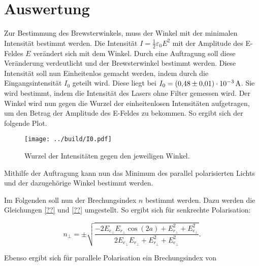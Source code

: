 


\section{Auswertung}
\label{sec:Auswertung}

Zur Bestimmung des Brewsterwinkels, muss der Winkel mit der minimalen Intensität bestimmt werden. 
Die Intensität $I=\frac1 2 \varepsilon_0 E^2$ mit der Amplitude des E-Feldes $E$ verändert sich mit dem Winkel. 
Durch eine Auftragung soll diese Veränderung verdeutlicht und der Brewsterwinkel bestimmt werden. 
Diese Intensität soll nun Einheitenlos gemacht werden, indem durch die Eingangsintensität $I_0$ geteilt wird. 
Diese liegt bei $I_0=\qty{0.48\pm0.01e-3}{\ampere}$. Sie wird bestimmt, indem die Intensität des Lasers ohne 
Filter gemessen wird. 
Der Winkel wird nun gegen die Wurzel der einheitenlosen Intensitäten aufgetragen, um den Betrag der Amplitude des E-Feldes zu bekommen. 
So ergibt sich der folgende Plot.

\begin{figure}
    \texttt{[image: ../build/I0.pdf]}
    \caption{Wurzel der Intensitäten gegen den jeweiligen Winkel.}
\end{figure}

\noindent Mithilfe der Auftragung kann nun das Minimum des parallel polarisierten Lichts und der dazugehörige Winkel bestimmt werden.  

Im Folgenden soll nun der Brechungsindex $n$ bestimmt werden. Dazu werden die Gleichungen \eqref{??} und \eqref{??} umgestellt. 
So ergibt sich für senkrechte Polarisation:

\begin{equation}
    n_\bot = \pm\sqrt{\frac{-2 E_{e_\bot} E_{r_\bot} \cos{(2a)} + E_{r_\bot}^2 + E_{e_\bot}^2 }{ 2 E_{e_\bot} E_{r_\bot} + E_{r_\bot}^2 + E_{e_\bot}^2  }}.
\end{equation}


\noindent Ebenso ergibt sich für parallele Polarisation ein Brechungsindex von 






